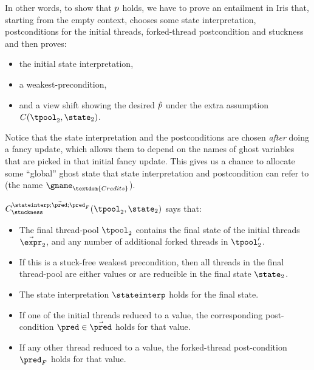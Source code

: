 In other words, to show that $p$ holds, we have to prove an entailment in Iris that, starting from the empty context, chooses some state interpretation, postconditions for the initial threads, forked-thread postcondition and stuckness and then proves:
\begin{itemize}
  \item the initial state interpretation,
  \item a weakest-precondition,
  \item and a view shift showing the desired $\hat{p}$ under the extra assumption $\consstate(\tpool_2, \state_2)$.
\end{itemize}
Notice that the state interpretation and the postconditions are chosen \emph{after} doing a fancy update, which allows them to depend on the names of ghost variables that are picked in that initial fancy update.
This gives us a chance to allocate some ``global'' ghost state that state interpretation and postcondition can refer to (\eg the name $\gname_{\textdom{Credits}}$).

$\consstate^{\stateinterp;\vec\pred;\pred_F}_{\stuckness}(\tpool_2, \state_2)$ says that:
\begin{itemize}
\item The final thread-pool $\tpool_2$ contains the final state of the initial threads $\vec\expr_2$, and any number of additional forked threads in $\tpool_2'$.
\item If this is a stuck-free weakest precondition, then all threads in the final thread-pool are either values or are reducible in the final state $\state_2$.
\item The state interpretation $\stateinterp$ holds for the final state.
\item If one of the initial threads reduced to a value, the corresponding post-condition $\pred \in \vec\pred$ holds for that value.
\item If any other thread reduced to a value, the forked-thread post-condition $\pred_F$ holds for that value.
\end{itemize}

~\par

